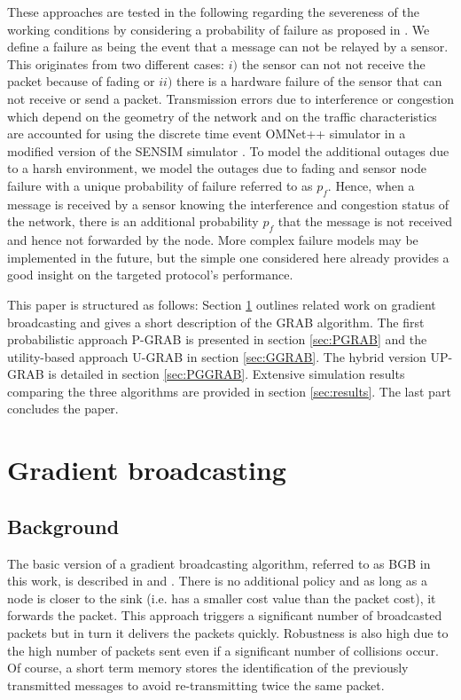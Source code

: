 \documentclass[journal, peerreview, onecolumn, draftcls]{IEEEtran}
\begin{document}
These approaches are tested in the following regarding the severeness of the working conditions by considering a probability of failure as proposed in \cite{GRAB05}. We define a failure as being the event that a message can not be relayed by a sensor. This originates from two different cases: $i)$ the sensor can not not receive the packet because of fading or $ii)$ there is a hardware failure of the sensor that can not receive or send a packet.
Transmission errors due to interference or congestion which depend on the geometry of the network and on the traffic characteristics are accounted for using the discrete time event OMNet++ simulator in a modified version of the SENSIM simulator \cite{LSUsimulator}. To model the additional outages due to a harsh environment, we model the outages due to fading and sensor node failure with a unique probability of failure referred to as $p_f$. Hence, when a message is received by a sensor knowing the interference and congestion status of the network, there is an additional probability $p_f$ that the message is not received and hence not forwarded by the node. More complex failure models may be implemented in the future, but the simple one considered here already provides a good insight on the targeted protocol's performance.

This paper is structured as follows: Section \ref{sec:gradientbroadcasting} outlines related work on gradient broadcasting and gives a short description of the GRAB algorithm. The first probabilistic approach P-GRAB is presented in section \ref{sec:PGRAB} and the utility-based approach U-GRAB in section \ref{sec:GGRAB}. The hybrid version UP-GRAB is detailed in section \ref{sec:PGGRAB}. Extensive simulation results comparing the three algorithms are provided in section \ref{sec:results}. The last part concludes the paper.


\section{Gradient broadcasting}\label{sec:gradientbroadcasting}

\subsection{Background}\label{subsec:background}

The basic version of a gradient broadcasting algorithm, referred to as BGB in this work, is described in \cite{Maroti04} and \cite{Poor}. There is no additional policy and as long as a node is closer to the sink (i.e. has a smaller cost value than the packet cost), it forwards the packet. This approach triggers a significant number of broadcasted packets but in turn it delivers the packets quickly. Robustness is also high due to the high number of packets sent even if a significant number of collisions occur. Of course, a short term memory stores the identification of the previously transmitted messages to avoid re-transmitting twice the same packet.
\end{document}
